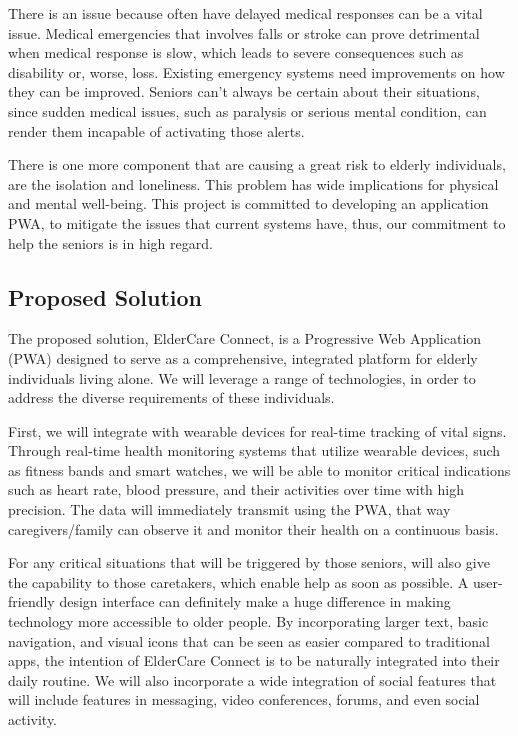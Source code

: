 \documentclass[a4paper, 12pt]{article}
\begin{document}
There is an issue because often have delayed medical responses can be a vital issue. Medical emergencies that involves falls or stroke can prove detrimental when medical response is slow, which leads to severe consequences such as disability or, worse, loss. Existing emergency systems need improvements on how they can be improved. Seniors can't always be certain about their situations, since sudden medical issues, such as paralysis or serious mental condition, can render them incapable of activating those alerts.

There is one more component that are causing a great risk to elderly individuals, are the isolation and loneliness. This problem has wide implications for physical and mental well-being.
This project is committed to developing an application PWA, to mitigate the issues that current systems have, thus, our commitment to help the seniors is in high regard.

\subsection{\textbf{\Large Proposed Solution}}
The proposed solution, ElderCare Connect, is a Progressive Web Application (PWA) designed to serve as a comprehensive, integrated platform for elderly individuals living alone. We will leverage a range of technologies, in order to address the diverse requirements of these individuals.

First, we will integrate with wearable devices for real-time tracking of vital signs. Through real-time health monitoring systems that utilize wearable devices, such as fitness bands and smart watches, we will be able to monitor critical indications such as heart rate, blood pressure, and their activities over time with high precision. The data will immediately transmit using the PWA, that way caregivers/family can observe it and monitor their health on a continuous basis.

For any critical situations that will be triggered by those seniors, will also give the capability to those caretakers, which enable help as soon as possible. A user-friendly design interface can definitely make a huge difference in making technology more accessible to older people. By incorporating larger text, basic navigation, and visual icons that can be seen as easier compared to traditional apps, the intention of ElderCare Connect is to be naturally integrated into their daily routine. We will also incorporate a wide integration of social features that will include features in messaging, video conferences, forums, and even social activity.
\end{document}
